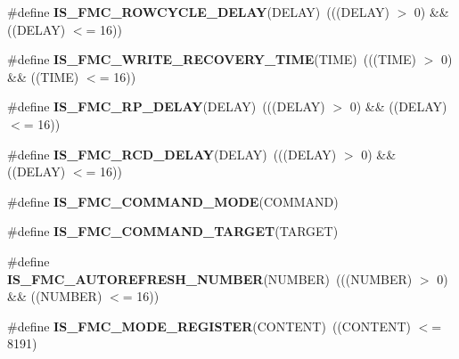 \begin{DoxyCompactItemize}
\item 
\#define {\bfseries I\+S\+\_\+\+F\+M\+C\+\_\+\+R\+O\+W\+C\+Y\+C\+L\+E\+\_\+\+D\+E\+L\+AY}(D\+E\+L\+AY)~(((D\+E\+L\+AY) $>$ 0) \&\& ((D\+E\+L\+AY) $<$= 16))\hypertarget{group___f_s_m_c___l_l___assert___macros_ga83dcdec0f7eaf3a4517faf246f941d52}{}\label{group___f_s_m_c___l_l___assert___macros_ga83dcdec0f7eaf3a4517faf246f941d52}

\item 
\#define {\bfseries I\+S\+\_\+\+F\+M\+C\+\_\+\+W\+R\+I\+T\+E\+\_\+\+R\+E\+C\+O\+V\+E\+R\+Y\+\_\+\+T\+I\+ME}(T\+I\+ME)~(((T\+I\+ME) $>$ 0) \&\& ((T\+I\+ME) $<$= 16))\hypertarget{group___f_s_m_c___l_l___assert___macros_ga70d65ba89ee9795cd90e85c7c21b56b3}{}\label{group___f_s_m_c___l_l___assert___macros_ga70d65ba89ee9795cd90e85c7c21b56b3}

\item 
\#define {\bfseries I\+S\+\_\+\+F\+M\+C\+\_\+\+R\+P\+\_\+\+D\+E\+L\+AY}(D\+E\+L\+AY)~(((D\+E\+L\+AY) $>$ 0) \&\& ((D\+E\+L\+AY) $<$= 16))\hypertarget{group___f_s_m_c___l_l___assert___macros_ga9461d4612907351a23d9d01562b003ae}{}\label{group___f_s_m_c___l_l___assert___macros_ga9461d4612907351a23d9d01562b003ae}

\item 
\#define {\bfseries I\+S\+\_\+\+F\+M\+C\+\_\+\+R\+C\+D\+\_\+\+D\+E\+L\+AY}(D\+E\+L\+AY)~(((D\+E\+L\+AY) $>$ 0) \&\& ((D\+E\+L\+AY) $<$= 16))\hypertarget{group___f_s_m_c___l_l___assert___macros_gaf98e456f020bf92f1f61795204342872}{}\label{group___f_s_m_c___l_l___assert___macros_gaf98e456f020bf92f1f61795204342872}

\item 
\#define {\bfseries I\+S\+\_\+\+F\+M\+C\+\_\+\+C\+O\+M\+M\+A\+N\+D\+\_\+\+M\+O\+DE}(C\+O\+M\+M\+A\+ND)
\item 
\#define {\bfseries I\+S\+\_\+\+F\+M\+C\+\_\+\+C\+O\+M\+M\+A\+N\+D\+\_\+\+T\+A\+R\+G\+ET}(T\+A\+R\+G\+ET)
\item 
\#define {\bfseries I\+S\+\_\+\+F\+M\+C\+\_\+\+A\+U\+T\+O\+R\+E\+F\+R\+E\+S\+H\+\_\+\+N\+U\+M\+B\+ER}(N\+U\+M\+B\+ER)~(((N\+U\+M\+B\+ER) $>$ 0) \&\& ((N\+U\+M\+B\+ER) $<$= 16))\hypertarget{group___f_s_m_c___l_l___assert___macros_ga47174e153ca3f9d05f26df7feaf94b29}{}\label{group___f_s_m_c___l_l___assert___macros_ga47174e153ca3f9d05f26df7feaf94b29}

\item 
\#define {\bfseries I\+S\+\_\+\+F\+M\+C\+\_\+\+M\+O\+D\+E\+\_\+\+R\+E\+G\+I\+S\+T\+ER}(C\+O\+N\+T\+E\+NT)~((C\+O\+N\+T\+E\+NT) $<$= 8191)\hypertarget{group___f_s_m_c___l_l___assert___macros_ga498ccad88f462a069b4e330fb63ff54e}{}\label{group___f_s_m_c___l_l___assert___macros_ga498ccad88f462a069b4e330fb63ff54e}


\end{DoxyCompactItemize}
